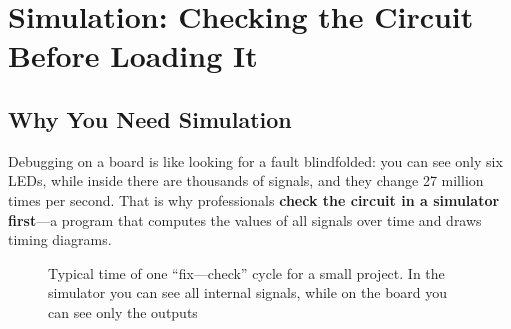 \chapter{Simulation: Checking the Circuit Before Loading It}
\label{ch:sim}

\section{Why You Need Simulation}

Debugging on a board is like looking for a fault blindfolded:
you can see only six LEDs, while inside there are thousands of signals, and they change
27 million times per second. That is why professionals \textbf{check the
circuit in a simulator first}---a program that computes the values of all
signals over time and draws timing diagrams.

\begin{figure}[H]
\centering
{}
\caption{Typical time of one ``fix---check'' cycle for a small
project. In the simulator you can see all internal signals, while on the board you can see only the
outputs}
\end{figure}

